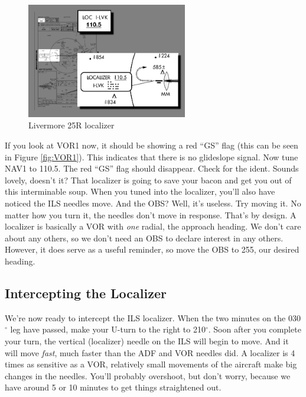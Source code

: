 
\begin{figure}
  \begin{center}
    \includegraphics[width=7cm]{img/localizer}
    \caption{Livermore 25R localizer}
    \label{fig:localizer}
  \end{center}
\end{figure}

If you look at VOR1 now, it should be showing a red ``GS'' flag (this
can be seen in Figure \ref{fig:VOR1}).  This indicates that there is
no glideslope signal.  Now tune NAV1 to 110.5.  The red ``GS'' flag should disappear.
Check for the ident.  Sounds lovely, doesn't it?  That localizer is
going to save your bacon and get you out of this interminable soup.
When you tuned into the localizer, you'll also have noticed the ILS
needles move.  And the OBS?  Well, it's useless.  Try moving it.  No
matter how you turn it, the needles don't move in response.  That's by
design.  A localizer is basically a VOR with \emph{one} radial, the
approach heading.  We don't care about any others, so we don't need an
OBS to declare interest in any others.  However, it does serve as a
useful reminder, so move the OBS to 255, our desired
heading.

\subsection{Intercepting the Localizer}

We're now ready to intercept the ILS localizer.  When the two minutes
on the 030$^\circ$ leg have passed, make your U-turn to the right to
210$^\circ$.
Soon after you complete your turn, the vertical (localizer) needle on
the ILS will begin to move.  And it will move \emph{fast}, much faster
than the ADF and VOR needles did.  A localizer is 4 times as sensitive as a VOR,
relatively small movements of the aircraft make big changes in the
needles.  You'll probably overshoot, but don't worry, because we have
around 5 or 10 minutes to get things straightened out.

